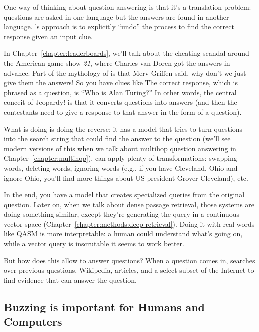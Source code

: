 One way of thinking about question answering is that it's a translation
problem: questions are asked in one language but the answers are found in
another language.
%
's approach is to explicitly ``undo'' the process to find the
correct response given an input clue.

In Chapter~\ref{chapter:leaderboards}, we'll talk about the cheating scandal
around the American game show \textit{21}, where Charles van Doren got
the answers in advance.
%
Part of the mythology of \jeopardy{} is that Merv Griffen said, why
don’t we just give them the answers!
%
So you have clues like 
%
The correct response, which is phrased as a question, is
``Who is Alan Turing?''
%
In other words, the central conceit of Jeopardy! is that it converts questions
into answers (and then the contestants need to give a response to that answer
in the form of a question).

What  is doing is doing the reverse: it has a model that
tries to turn questions into the search string that could find the
answer to the question (we'll see modern versions of this when we talk about
multihop question answering in Chapter~\ref{chapter:multihop}).
%
 can apply plenty of transformations: swapping words,
deleting words, ignoring words (e.g., if you have Cleveland, Ohio and ignore
Ohio, you’ll find more things about US president Grover Cleveland), etc.


In the end, you have a model that creates specialized queries from the
original question.
%
Later on, when we talk about dense passage
retrieval, those systems are doing something similar, except they’re
generating the query in a continuous vector space (Chapter~\ref{chapter:methods:deep-retrieval}).
%
Doing it with real words like QASM is more interpretable: a human could
understand what’s going on, while a vector query is inscrutable it seems to
work better.

But how does this allow \watson{} to answer questions?
%
When a question comes in, \watson{} searches over previous \jeopardy{}
questions, Wikipedia, articles, and a select subset of the Internet to find
evidence that can answer the question.

\subsection{Buzzing is important for Humans and Computers}


